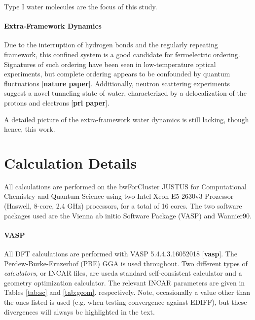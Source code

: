         Type I water molecules are the focus of this study.
        
        \paragraph{Extra-Framework Dynamics} Due to the interruption of hydrogen bonds and the regularly repeating framework, this confined system is a good candidate for ferroelectric ordering. Signatures of such ordering have been seen in low-temperature optical experiments, but complete ordering appears to be confounded by quantum fluctuations [\textbf{nature paper}]. Additionally, neutron scattering experiments suggest a novel tunneling state of water, characterized by a delocalization of the protons and electrons [\textbf{prl paper}].
        
        A detailed picture of the extra-framework water dynamics is still lacking, though \textemdash hence, this work.
        
    \section{Calculation Details}
    
    All calculations are performed on the bwForCluster JUSTUS for Computational Chemistry and Quantum Science using two Intel Xeon E5-2630v3 Prozessor (Haswell, 8-core, 2.4 GHz) processors, for a total of 16 cores. The two software packages used are the Vienna ab initio Software Package (VASP) and Wannier90.
    
    \paragraph{VASP} All DFT calculations are performed with VASP 5.4.4.3.16052018 [\textbf{vasp}]. The Perdew-Burke-Ernzerhof (PBE) GGA is used throughout. Two different types of \textit{calculators}, or INCAR files, are used\textemdash a standard self-consistent calculator and a geometry optimization calculator. The relevant INCAR parameters are given in Tables \ref{tab:sc} and \ref{tab:geom}. respectively. Note, occasionally a value other than the ones listed is used (e.g. when testing convergence against EDIFF), but these divergences will always be highlighted in the text.
    

